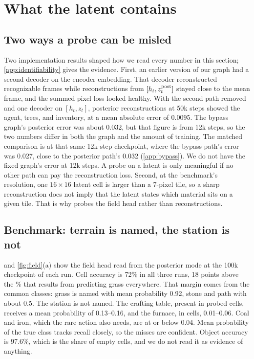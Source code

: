 \section{What the latent contains}
\label{sec:latent}

\subsection{Two ways a probe can be misled}

Two implementation results shaped how we read every number in this section; \cref{app:identifiability} gives the evidence.
First, an earlier version of our graph had a second decoder on the encoder embedding.
That decoder reconstructed recognizable frames while reconstructions from $[h_t,z^{\mathrm{post}}_t]$ stayed close to the mean frame, and the summed pixel loss looked healthy.
With the second path removed and one decoder on $[h_t, z_t]$, posterior reconstructions at 50k steps showed the agent, trees, and inventory, at a mean absolute error of 0.0095. The bypass graph's posterior error was about 0.032, but that figure is from 12k steps, so the two numbers differ in both the graph and the amount of training. The matched comparison is at that same 12k-step checkpoint, where the bypass path's error was 0.027, close to the posterior path's 0.032 (\cref{app:bypass}). We do not have the fixed graph's error at 12k steps.
A probe on a latent is only meaningful if no other path can pay the reconstruction loss.
Second, at the benchmark's resolution, one $16\times16$ latent cell is larger than a 7-pixel tile, so a sharp reconstruction does not imply that the latent states which material sits on a given tile.
That is why \method{} probes the field head rather than reconstructions.

\subsection{Benchmark: terrain is named, the station is not}

 and \cref{fig:field}(a) show the field head read from the posterior mode at the 100k checkpoint of each run.
Cell accuracy is 72\% in all three runs, 18 points above the \FieldBaseline\% that results from predicting grass everywhere.
That margin comes from the common classes: grass is named with mean probability 0.92, stone and path with about 0.5.
The station is not named.
The crafting table, present in \FieldTableCells{} probed cells, receives a mean probability of 0.13--0.16, and the furnace, in \FieldFurnaceCells{} cells, 0.01--0.06.
Coal and iron, which the rare action also needs, are at or below 0.04.
Mean probability of the true class tracks recall closely, so the misses are confident.
Object accuracy is 97.6\%, which is the share of empty cells, and we do not read it as evidence of anything.


